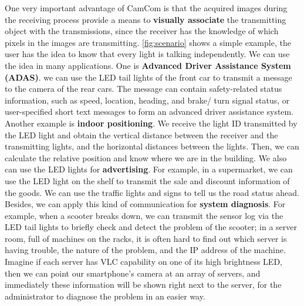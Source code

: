 One very important advantage of CamCom is that the acquired images during the receiving process provide a means to \textbf{visually associate} the transmitting object with the transmissions, since the receiver has the knowledge of which pixels in the images are transmitting. \autoref{fig:scenario} shows a simple example, the user has the idea to know that every light is talking independently. We can use the idea in many applications. One is \textbf{Advanced Driver Assistance System (ADAS)}. we can use the LED tail lights of the front car to transmit a message to the camera of the rear cars. The message can contain safety-related status information, such as speed, location, heading, and brake/ turn signal status, or user-specified short text messages to form an advanced driver assistance system. 
Another example is \textbf{indoor positioning}. We receive the light ID transmitted by the LED light and obtain the vertical distance between the receiver and the transmitting lights, and the horizontal distances between the lights. Then, we can calculate the relative position and know where we are in the building. 
We also can use the LED lights for \textbf{advertising}. For example, in a supermarket, we can use the LED light on the shelf to transmit the sale and discount information of the goods. We can use the traffic lights and signs to tell us the road status ahead. 
Besides, we can apply this kind of communication for \textbf{system diagnosis}. For example, when a scooter breaks down, we can transmit the sensor log via the LED tail lights to briefly check and detect the problem of the scooter; in a server room, full of machines on the racks, it is often hard to find out which server is having trouble, the nature of the problem, and the IP address of the machine. Imagine if each server has VLC capability on one of its high brightness LED, then we can point our smartphone's camera at an array of servers, and immediately these information will be shown right next to the server, for the administrator to diagnose the problem in an easier way.  

